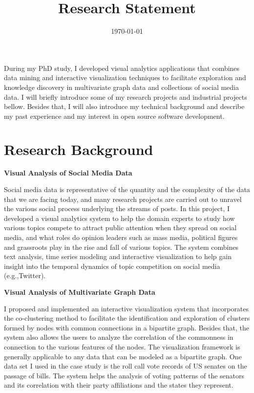 \documentclass[11pt,a4paper,sans]{moderncv} %
\title{Research Statement}
\begin{document}
\date{\today} %

During my PhD study, I developed visual analytics applications that combines data mining and interactive visualization techniques to facilitate exploration and knowledge discovery in multivariate graph data and collections of social media data. I will briefly introduce some of my research projects and industrial projects bellow. Besides that, I will also introduce my technical background and describe my past experience and my interest in open source software development. 

\section{Research Background}

\textbf{Visual Analysis of Social Media Data}

Social media data is representative of the quantity and the complexity of the data that we are facing today, and many research projects are carried out to unravel the various social process underlying the streams of posts. In this project, I developed a visual analytics system to help the domain experts to study how various topics compete to attract public attention when they spread on social media, and what roles do opinion leaders such as mass media, political figures and grassroots play in the rise and fall of various topics. The system combines text analysis, time series modeling and interactive visualization to help gain insight into the temporal dynamics of topic competition on social media (e.g.,Twitter).

\textbf{Visual Analysis of Multivariate Graph Data}

I proposed and implemented an interactive visualization system that incorporates the co-clustering method to facilitate the identification and exploration of clusters formed by nodes with common connections in a bipartite graph. Besides that, the system also allows the users to analyze the correlation of the commonness in connection to the various features of the nodes. The visualization framework is generally applicable to any data that can be modeled as a bipartite graph. One data set I used in the case study is the roll call vote records of US senates on the passage of bills. The system helps the analysis of voting patterns of the senators and its correlation with their party affiliations and the states they represent.
\end{document}
